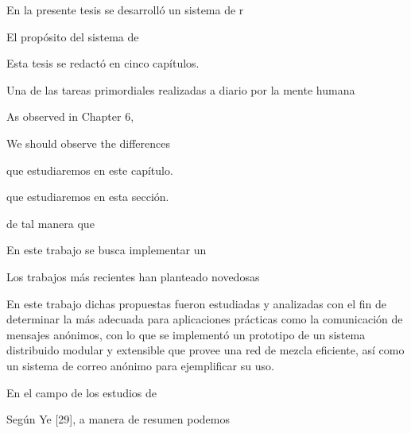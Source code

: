 En la presente tesis se desarrolló un sistema de r

El propósito del sistema de


Esta tesis se redactó en cinco capítulos. 


Una de las tareas primordiales realizadas a diario por la mente humana 



As observed in Chapter 6, 



We should observe the differences




que estudiaremos en este capítulo.


que estudiaremos en esta sección.



de tal manera que 



En este trabajo se busca implementar un 


Los trabajos más recientes han planteado novedosas

 En este trabajo dichas propuestas fueron estudiadas y analizadas con el fin de determinar la más adecuada para aplicaciones prácticas como la comunicación de mensajes anónimos, con lo que se implementó un prototipo de un sistema distribuido modular y extensible que provee una red de mezcla eficiente, así como un sistema de correo anónimo para ejemplificar su uso.



En el campo de los estudios de 



Según Ye [29], a manera de resumen podemos



